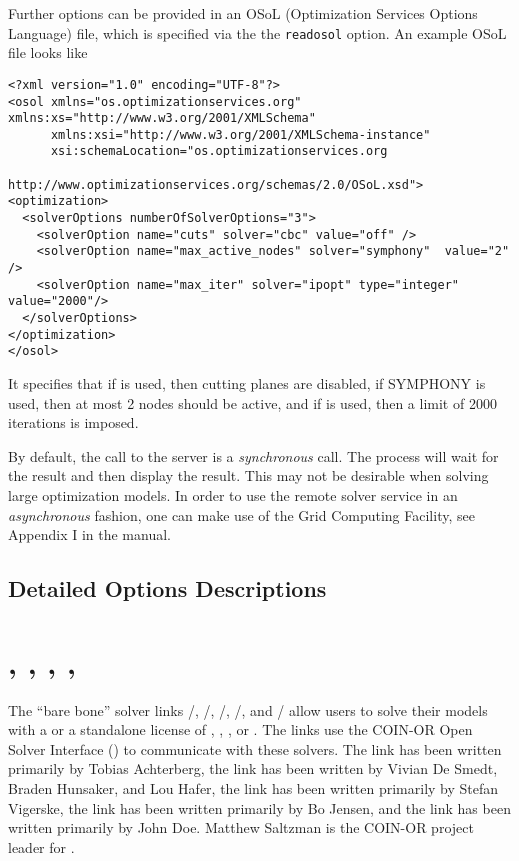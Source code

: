 Further options can be provided in an OSoL (Optimization Services Options Language) file, which is specified via the the \texttt{readosol} option.
An example OSoL file looks like
\begin{verbatim}
<?xml version="1.0" encoding="UTF-8"?>
<osol xmlns="os.optimizationservices.org" xmlns:xs="http://www.w3.org/2001/XMLSchema"
      xmlns:xsi="http://www.w3.org/2001/XMLSchema-instance"
      xsi:schemaLocation="os.optimizationservices.org
                          http://www.optimizationservices.org/schemas/2.0/OSoL.xsd">
<optimization>
  <solverOptions numberOfSolverOptions="3">
    <solverOption name="cuts" solver="cbc" value="off" />
    <solverOption name="max_active_nodes" solver="symphony"  value="2" />
    <solverOption name="max_iter" solver="ipopt" type="integer" value="2000"/> 
  </solverOptions>
</optimization>
</osol>
\end{verbatim}
It specifies that if \CBC is used, then cutting planes are disabled,
if \textsc{SYMPHONY} is used, then at most 2 nodes should be active,
and if \IPOPT is used, then a limit of 2000 iterations is imposed.

By default, the call to the server is a \emph{synchronous} call.
The \MYGAMS process will wait for the result and then display the result.
This may not be desirable when solving large optimization models.
In order to use the remote solver service in an \emph{asynchronous} fashion, one can make use of the \MYGAMS Grid Computing Facility, see Appendix I in the \MYGAMS manual.

\subsection{Detailed Options Descriptions}



\section{\OSICPLEX, \OSIGLPK, \OSIGUROBI, \OSIMOSEK, \OSIXPRESS}

The ``bare bone'' solver links \MYGAMS/\OSICPLEX, \MYGAMS/\OSIGLPK, \MYGAMS/\OSIGUROBI, \MYGAMS/\OSIMOSEK, and \MYGAMS/\OSIXPRESS 
allow users to solve their \MYGAMS models with a \GLPK or a standalone license of \CPLEX, \GUROBI, \MOSEK, or \XPRESS.
The links use the COIN-OR Open Solver Interface (\OSI) to communicate with these solvers.
The \OSICPLEX link has been written primarily by Tobias Achterberg,
the \OSIGLPK link has been written by Vivian De Smedt, Braden Hunsaker, and Lou Hafer,
the \OSIGUROBI link has been written primarily by Stefan Vigerske,
the \OSIMOSEK link has been written primarily by Bo Jensen, and
the \OSIXPRESS link has been written primarily by John Doe.
Matthew Saltzman is the COIN-OR project leader for \OSI.

